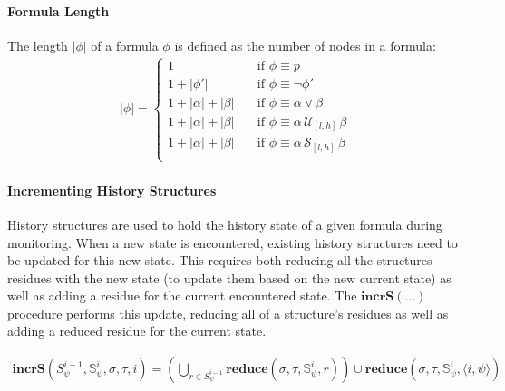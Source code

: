 \documentclass[]{llncs}
\newcommand{\rp}[2]{\ensuremath{\langle #1, #2 \rangle}}
\begin{document}
\paragraph{Formula Length}
The length $|\phi|$ of a formula $\phi$ is defined as the number of nodes in a formula: 
\begin{align*}
|\phi| = \left\lbrace
\begin{aligned}
1 & \quad \text{if } \phi \equiv p \\
1 + |\phi'| & \quad \text{if } \phi \equiv \neg \phi' \\
1 + |\alpha| + |\beta| & \quad \text{if } \phi \equiv \alpha \vee \beta \\
1 + |\alpha| + |\beta| & \quad \text{if } \phi \equiv \alpha\, \mathcal{U}_{[l,h]}\, \beta \\
1 + |\alpha| + |\beta| & \quad \text{if } \phi \equiv \alpha\, \mathcal{S}_{[l,h]}\, \beta \\
\end{aligned} \right.
\end{align*}



\paragraph{Incrementing History Structures}
History structures are used to hold the history state of a given formula during monitoring.
When a new state is encountered, existing history structures need to be updated for this new state. This requires both reducing all the structures residues with the new state (to update them based on the new current state) as well as adding a residue for the current encountered state. The $\mathbf{incrS}(\dots)$ procedure performs this update, reducing all of a structure's residues as well as adding a reduced residue for the current state.

\begin{align*}
\mathbf{incrS}(S^{i-1}_\psi, \mathbb{S}^i_{\psi}, \sigma, \tau, i) = %
\left(\bigcup\limits_{r \in S^{i-1}_{\psi}} \mathbf{reduce}(\sigma, \tau, \mathbb{S}^i_{\psi}, r)\right) \cup \mathbf{reduce}(\sigma, \tau, \mathbb{S}^i_{\psi}, \rp{i}{\psi})
\end{align*}
\end{document}

